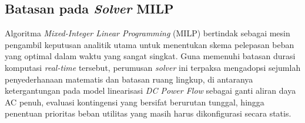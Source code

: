 \subsection{Batasan pada \textit{Solver} MILP}
\label{subsec:Batasan_pada_Solver_MILP}

Algoritma \textit{Mixed-Integer Linear Programming} (MILP) bertindak sebagai mesin pengambil keputusan analitik utama untuk menentukan skema pelepasan beban yang optimal dalam waktu yang sangat singkat. Guna memenuhi batasan durasi komputasi \textit{real-time} tersebut, perumusan \textit{solver} ini terpaksa mengadopsi sejumlah penyederhanaan matematis dan batasan ruang lingkup, di antaranya ketergantungan pada model linearisasi \textit{DC Power Flow} sebagai ganti aliran daya AC penuh, evaluasi kontingensi yang bersifat berurutan tunggal, hingga penentuan prioritas beban utilitas yang masih harus dikonfigurasi secara statis.

